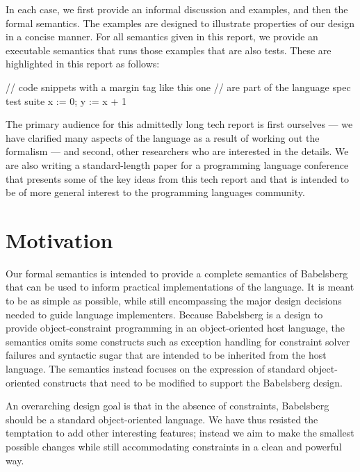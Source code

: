 \documentclass{article}
\newcounter{examples}
\begin{document}
In each case, we first provide an informal discussion and examples,
and then the formal semantics. The examples are designed to illustrate
properties of our design in a concise manner. For all semantics given
in this report, we provide an executable semantics that runs those
examples that are also tests.  These are highlighted in this report
as follows:

\setcounter{examples}{100}
\begin{example}
// code snippets with a margin tag like this one
// are part of the language spec test suite
x := 0;
y := x + 1
\end{example}
\setcounter{examples}{0}

The primary audience for this admittedly long tech report is first
ourselves --- we have clarified many aspects of the language as a
result of working out the formalism --- and second, other researchers
who are interested in the details.  We are also writing a
standard-length paper for a programming language conference that
presents some of the key ideas from this tech report and that is
intended to be of more general interest to the programming languages
community.

\section{Motivation}

Our formal semantics is intended to provide a complete semantics of
Babelsberg that can be used to inform practical implementations of
the language.  It is meant to be as simple as possible, while still 
encompassing the
major design decisions needed to guide language implementers. Because
Babelsberg is a design to provide object-constraint programming in an
object-oriented host language, the semantics omits some constructs
such as exception handling for constraint solver failures and
syntactic sugar that are intended to be inherited from the host
language. The semantics instead focuses on the expression of standard
object-oriented constructs that need to be modified to support the
Babelsberg design.

An overarching design goal is that in the absence of constraints,
Babelsberg should be a standard object-oriented language.  We
have thus resisted the temptation to add other interesting features;
instead we aim to make the smallest possible changes while still accommodating
constraints in a clean and powerful way.
\end{document}
